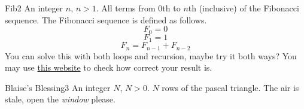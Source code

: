 \begin{task}{Fib}{2}
\In
An integer $n$, $n > 1$.
\Out
All terms from 0th to $n$th (inclusive) of the Fibonacci sequence.
The Fibonacci sequence is defined as follows.
$$F_0 = 0$$
$$F_1 = 1$$
$$F_n = F_{n - 1} + F_{n - 2}$$
\Note
You can solve this with both loops and recursion, maybe try it both ways?
You may use \href{https://oeis.org/}{this website} to check how correct your result is.
\begin{ExampleIO}
\end{ExampleIO}
\end{task}

\begin{task}{Blaise's Blessing}{3}
\In
An integer $N$, $N > 0$.
\Out
$N$ rows of the pascal triangle.
\Hint
The air is stale, open the \textit{window} please.

\begin{ExampleIO}
\end{ExampleIO}
\end{task}

